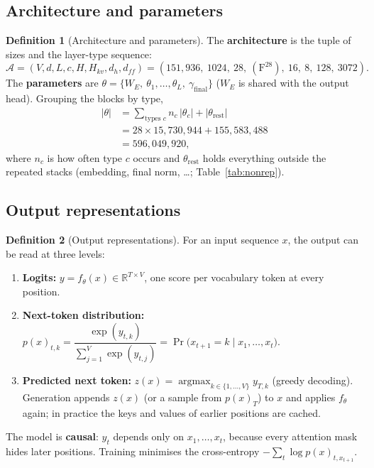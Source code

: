 \documentclass[10pt,a4paper]{article}
\theoremstyle{definition}
\newtheorem{definition}{Definition}[section]
\begin{document}
\subsection{Architecture and parameters}
\begin{definition}[Architecture and parameters]
The \textbf{architecture} is the tuple of sizes and the layer-type sequence:
\begin{equation}
  \mathcal{A} = (V,d,L,c,H,H_{kv},d_h,d_{ff}) = (151{,}936,\ 1024,\ 28,\ (\mathrm{F}^{28}),\ 16,\ 8,\ 128,\ 3072).
\end{equation}
The \textbf{parameters} are $\theta=\{W_E,\ \theta_1,\dots,\theta_L,\ \gamma_{\mathrm{final}}\}$ ($W_E$ is shared with the output head). Grouping the blocks by type,
\begin{align*}
  |\theta| &= \sum_{\text{types } c} n_c\,|\theta_c| + |\theta_{\mathrm{rest}}| \\
  &= 28\times15{,}730{,}944 + 155{,}583{,}488 \\
  &= 596{,}049{,}920,
\end{align*}
where $n_c$ is how often type $c$ occurs and $\theta_{\mathrm{rest}}$ holds everything outside the repeated stacks (embedding, final norm, \dots; Table~\ref{tab:nonrep}).
\end{definition}
\subsection{Output representations}
\begin{definition}[Output representations]
For an input sequence $x$, the output can be read at three levels:
\begin{enumerate}
\item \textbf{Logits:} $y=f_\theta(x)\in\mathbb{R}^{T\times V}$, one score per vocabulary token at every position.
\item \textbf{Next-token distribution:} $p(x)_{t,k}=\dfrac{\exp(y_{t,k})}{\sum_{j=1}^{V}\exp(y_{t,j})}=\Pr\big(x_{t+1}=k\mid x_{1},\dots,x_{t}\big)$.
\item \textbf{Predicted next token:} $z(x)=\operatorname{argmax}_{k\in\{1,\dots,V\}} y_{T,k}$ (greedy decoding). Generation appends $z(x)$ (or a sample from $p(x)_{T}$) to $x$ and applies $f_\theta$ again; in practice the keys and values of earlier positions are cached.
\end{enumerate}
The model is \textbf{causal}: $y_t$ depends only on $x_1,\dots,x_t$, because every attention mask hides later positions. Training minimises the cross-entropy $-\sum_{t}\log p(x)_{t,x_{t+1}}$.
\end{definition}
\end{document}
